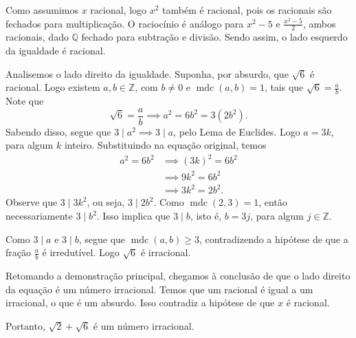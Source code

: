 \documentclass[12pt]{article}
\DeclareMathOperator{\mdc}{mdc}
\begin{document}
	Como assumimos $x$ racional, logo $x^2$ também é racional, pois os racionais são fechados para multiplicação. O raciocínio é análogo para $x^2 - 5$ e $\frac{x^2 - 5}{2}$, ambos racionais, dado $\mathbb{Q}$ fechado para subtração e divisão. Sendo assim, o lado esquerdo da igualdade é racional.
	
	Analisemos o lado direito da igualdade. Suponha, por absurdo, que $\sqrt{6}$ é racional. Logo existem $a, b \in \mathbb{Z}$, com $b \neq 0$ e $\mdc(a,b) = 1$, tais que $\sqrt{6} = \frac{a}{b}$. Note que
	\[
	\sqrt{6} = \frac{a}{b} \implies a^2 = 6b^2 = 3(2b^2).
	\]
	Sabendo disso, segue que $3 \mid a^2 \implies 3 \mid a$, pelo Lema de Euclides. Logo $a = 3k$, para algum $k$ inteiro. Substituindo na equação original, temos
	\begin{align*}
		a^2 = 6b^2
		&\implies (3k)^2 = 6b^2 \\
		&\implies 9k^2 = 6b^2 \\
		&\implies 3k^2 = 2b^2.
	\end{align*}
    Observe que $3 \mid 3k^2$, ou seja, $3 \mid 2b^2$. Como $\mdc(2,3) = 1$, então necessariamente $3 \mid b^2$. Isso implica que $3 \mid b$, isto é, $b = 3j$, para algum $j \in \mathbb{Z}$.
    
    Como $3 \mid a$ e $3 \mid b$, segue que $\mdc(a,b) \geq 3$, contradizendo a hipótese de que a fração $\frac{a}{b}$ é irredutível. Logo $\sqrt{6}$ é irracional.
    
    Retomando a demonstração principal, chegamos à conclusão de que o lado direito da equação é um número irracional. Temos que um racional é igual a um irracional, o que é um absurdo. Isso contradiz a hipótese de que $x$ é racional.
    
    Portanto, $\sqrt{2} + \sqrt{6}$ é um número irracional. \blacksquare
\end{document}
